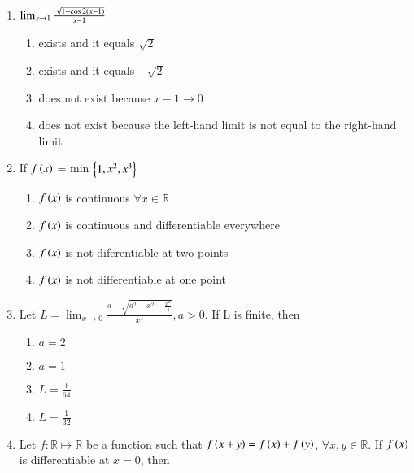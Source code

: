 \documentclass[journal]{IEEEtran}
\numberwithin{equation}{enumi}
\numberwithin{figure}{enumi}
\begin{document}
\begin{enumerate}
    \item 
    $\lim_{x \to1}\frac{\sqrt{1-\cos 2\left(x-1\right)}}{x-1}$ 

    \hfill{}
    
    \begin{enumerate}
        \item exists and it equals $\sqrt{2}$
        \item exists and it equals $-\sqrt{2}$
        \item does not exist because $x-1\to 0$
        \item does not exist because the left-hand limit is not equal to the right-hand limit
    \end{enumerate}


    \item 
    If $f\left(x\right)$ = min $\left\{1,x^2,x^3\right\}$ 

    \hfill{}
    
    \begin{enumerate}
        \item $f\left(x\right)$ is continuous $\forall x \in \mathbb{R}$
        \item $f\left(x\right)$ is continuous and differentiable everywhere
        \item $f\left(x\right)$ is not diferentiable at two points
        \item $f\left(x\right)$ is not differentiable at one point
    \end{enumerate}

    \item 
    Let $L=\lim_{x \to0}\frac{a-\sqrt{a^2-x^2-\frac{x^2}{4}}}{x^4}, a>0$. If L is finite, then 

    \hfill{}
    
    \begin{multicols}{4}
    \begin{enumerate}
        \item $a=2$ 
        \item $a=1$
        \item $L=\frac{1}{64}$
        \item $L=\frac{1}{32}$
    \end{enumerate}
    \end{multicols}	    


    \item 
    Let $f:\mathbb{R} \mapsto \mathbb{R}$ be a function such that $f\left(x+y\right)=f\left(x\right)+f\left(y\right)$, $\forall x,y\in \mathbb{R}$. If $f\left(x\right)$ is differentiable at $x=0$, then 


\end{enumerate}
\end{document}
